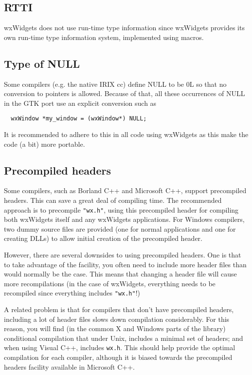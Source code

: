 \subsection{RTTI}

wxWidgets does not use run-time type information since wxWidgets provides
its own run-time type information system, implemented using macros.

\subsection{Type of NULL}

Some compilers (e.g. the native IRIX cc) define NULL to be 0L so that
no conversion to pointers is allowed. Because of that, all these
occurrences of NULL in the GTK port use an explicit conversion such 
as

{\small
\begin{verbatim}
  wxWindow *my_window = (wxWindow*) NULL;
\end{verbatim}
}

It is recommended to adhere to this in all code using wxWidgets as
this make the code (a bit) more portable.

\subsection{Precompiled headers}

Some compilers, such as Borland C++ and Microsoft C++, support
precompiled headers. This can save a great deal of compiling time. The
recommended approach is to precompile {\tt "wx.h"}, using this
precompiled header for compiling both wxWidgets itself and any
wxWidgets applications. For Windows compilers, two dummy source files
are provided (one for normal applications and one for creating DLLs)
to allow initial creation of the precompiled header.

However, there are several downsides to using precompiled headers. One
is that to take advantage of the facility, you often need to include
more header files than would normally be the case. This means that
changing a header file will cause more recompilations (in the case of
wxWidgets, everything needs to be recompiled since everything includes {\tt "wx.h"}!)

A related problem is that for compilers that don't have precompiled
headers, including a lot of header files slows down compilation
considerably. For this reason, you will find (in the common
X and Windows parts of the library) conditional
compilation that under Unix, includes a minimal set of headers;
and when using Visual C++, includes {\tt wx.h}. This should help provide
the optimal compilation for each compiler, although it is
biased towards the precompiled headers facility available
in Microsoft C++.

